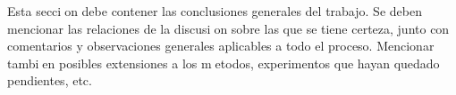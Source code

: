 Esta seccion debe contener las conclusiones generales del trabajo.  Se deben mencionar
las  relaciones  de  la  discusion  sobre  las  que  se  tiene  certeza,  junto  con  comentarios
y  observaciones  generales  aplicables  a  todo  el  proceso.   Mencionar  tambien  posibles
extensiones a los metodos, experimentos que hayan quedado pendientes, etc.

